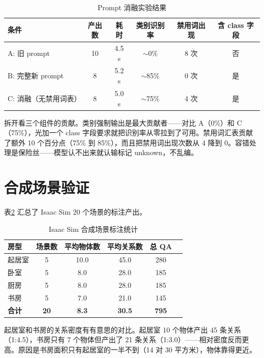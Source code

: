 \begin{table}[H]
\centering
\caption{Prompt 消融实验结果}
\label{tab:ablation}
\begin{tabular}{lccccc}
\toprule
\textbf{条件} & \textbf{产出数} & \textbf{耗时} & \textbf{类别识别率} & \textbf{禁用词出现} & \textbf{含 class 字段} \\
\midrule
A: 旧 prompt & 10 & 4.5 s & $\sim$0\% & 8 次 & 否 \\
B: 完整新 prompt & 8 & 5.2 s & $\sim$85\% & 0 次 & 是 \\
C: 消融（无禁用词表） & 8 & 5.0 s & $\sim$75\% & 4 次 & 是 \\
\bottomrule
\end{tabular}
\end{table}

拆开看三个组件的贡献。类别强制输出是最大贡献者——对比 A（0\%）和 C（75\%），光加一个 class 字段要求就把识别率从零拉到了可用。禁用词汇表贡献了额外 10 个百分点（75\% 到 85\%），而且把禁用词出现次数从 4 降到 0。容错处理是保险丝——模型认不出来就认输标记 unknown，不乱编。

\section{合成场景验证}

表\ref{tab:isaac_results} 汇总了 Isaac Sim 20 个场景的标注产出。

\begin{table}[H]
\centering
\caption{Isaac Sim 合成场景标注统计}
\label{tab:isaac_results}
\begin{tabular}{lccccc}
\toprule
\textbf{房型} & \textbf{场景数} & \textbf{平均物体数} & \textbf{平均关系数} & \textbf{总 QA} \\
\midrule
起居室 & 5 & 10.0 & 45.0 & 280 \\
卧室 & 5 & 8.0 & 28.0 & 185 \\
厨房 & 5 & 8.0 & 28.0 & 185 \\
书房 & 5 & 7.0 & 21.0 & 145 \\
\midrule
\textbf{合计} & \textbf{20} & \textbf{8.3} & \textbf{30.5} & \textbf{795} \\
\bottomrule
\end{tabular}
\end{table}

起居室和书房的关系密度有有意思的对比。起居室 10 个物体产出 45 条关系（1:4.5），书房只有 7 个物体但产出了 21 条关系（1:3.0）——相对密度反而更高。原因是书房面积只有起居室的一半不到（14 对 30 平方米），物体靠得更近。

